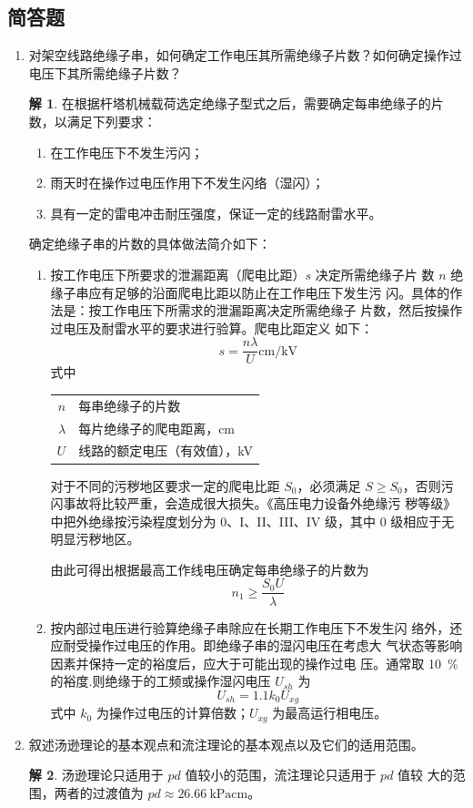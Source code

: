 \documentclass[zihao=-4,fontset = none]{ctexart}
\theoremstyle{definition}
\newtheorem*{solution}{解}
\begin{document}
\subsection{简答题}
\begin{enumerate}
  \item 对架空线路绝缘子串，如何确定工作电压其所需绝缘子片数？如何确定操作过电压下其所需绝缘子片数？
  \begin{solution}
    在根据杆塔机械载荷选定绝缘子型式之后，需要确定每串绝缘子的片数，以满足下列要求：
    \begin{enumerate}
      \item 在工作电压下不发生污闪；
      \item 雨天时在操作过电压作用下不发生闪络（湿闪）；
      \item 具有一定的雷电冲击耐压强度，保证一定的线路耐雷水平。
    \end{enumerate}
    确定绝缘子串的片数的具体做法简介如下：
    \begin{enumerate}
      \item 按工作电压下所要求的泄漏距离（爬电比距）$s$ 决定所需绝缘子片
      数 $n$ 绝缘子串应有足够的沿面爬电比距以防止在工作电压下发生污
      闪。具体的作法是：按工作电压下所需求的泄漏距离决定所需绝缘子
      片数，然后按操作过电压及耐雷水平的要求进行验算。爬电比距定义
      如下：
      \[ s = \frac{n \lambda}{U} \si{\cm/\kV} \]
      式中\begin{tabular}[t]{r@{——}l}
        $n$ & 每串绝缘子的片数 \\
        $\lambda$ & 每片绝缘子的爬电距离，\si{cm} \\
        $U$ & 线路的额定电压（有效值），\si{kV}
      \end{tabular}

      对于不同的污秽地区要求一定的爬电比距 $S_0$，必须满足 $S \geqslant S_0$，否则污闪事故将比较严重，会造成很大损失。《高压电力设备外绝缘污
      秽等级》中把外绝缘按污染程度划分为 0、I、II、III、IV 级，其中 0
      级相应于无明显污秽地区。

      由此可得出根据最高工作线电压确定每串绝缘子的片数为
      \[ n_1 \geqslant \frac{S_0 U}{\lambda} \]
      \item 按内部过电压进行验算绝缘子串除应在长期工作电压下不发生闪
      络外，还应耐受操作过电压的作用。即绝缘子串的湿闪电压在考虑大
      气状态等影响因素并保持一定的裕度后，应大于可能出现的操作过电
      压。通常取 \SI{10}{\percent} 的裕度.则绝缘于的工频或操作湿闪电压 $U_{sh}$ 为
      \[ U_{sh} = 1.1 k_0 U_{xg} \]
      式中 $k_0$ 为操作过电压的计算倍数；$U_{xg}$ 为最高运行相电压。
    \end{enumerate}
  \end{solution}
  \item 叙述汤逊理论的基本观点和流注理论的基本观点以及它们的适用范围。
  \begin{solution}
    汤逊理论只适用于 $pd$ 值较小的范围，流注理论只适用于 $pd$ 值较
    大的范围，两者的过渡值为 $pd \approx \SI{26.66}{\kPa \cm}$。


\end{solution}
\end{enumerate}
\end{document}
